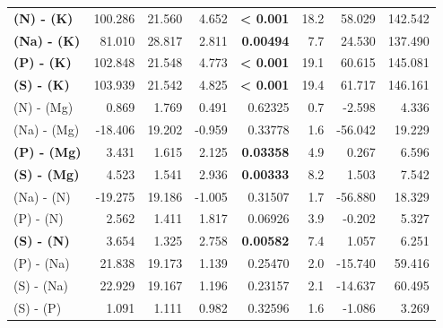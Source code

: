 \begin{table}[H]
\begin{tabular}[t]{>{}lrrr>{}rrrr}
\textbf{(N) - (K)} & 100.286 & 21.560 & 4.652 & \textbf{< 0.001} & 18.2 & 58.029 & 142.542\\
\textbf{(Na) - (K)} & 81.010 & 28.817 & 2.811 & \textbf{0.00494} & 7.7 & 24.530 & 137.490\\
\textbf{(P) - (K)} & 102.848 & 21.548 & 4.773 & \textbf{< 0.001} & 19.1 & 60.615 & 145.081\\
\textbf{(S) - (K)} & 103.939 & 21.542 & 4.825 & \textbf{< 0.001} & 19.4 & 61.717 & 146.161\\
(N) - (Mg) & 0.869 & 1.769 & 0.491 & 0.62325 & 0.7 & -2.598 & 4.336\\
(Na) - (Mg) & -18.406 & 19.202 & -0.959 & 0.33778 & 1.6 & -56.042 & 19.229\\
\textbf{(P) - (Mg)} & 3.431 & 1.615 & 2.125 & \textbf{0.03358} & 4.9 & 0.267 & 6.596\\
\textbf{(S) - (Mg)} & 4.523 & 1.541 & 2.936 & \textbf{0.00333} & 8.2 & 1.503 & 7.542\\
(Na) - (N) & -19.275 & 19.186 & -1.005 & 0.31507 & 1.7 & -56.880 & 18.329\\
(P) - (N) & 2.562 & 1.411 & 1.817 & 0.06926 & 3.9 & -0.202 & 5.327\\
\textbf{(S) - (N)} & 3.654 & 1.325 & 2.758 & \textbf{0.00582} & 7.4 & 1.057 & 6.251\\
(P) - (Na) & 21.838 & 19.173 & 1.139 & 0.25470 & 2.0 & -15.740 & 59.416\\
(S) - (Na) & 22.929 & 19.167 & 1.196 & 0.23157 & 2.1 & -14.637 & 60.495\\
(S) - (P) & 1.091 & 1.111 & 0.982 & 0.32596 & 1.6 & -1.086 & 3.269\\
\bottomrule
\end{tabular}
\end{table}
